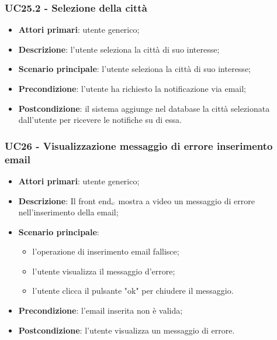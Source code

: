 \subsubsection{UC25.2 - Selezione della città}\label{CasiDUsoCasiDUsoFacoltativiTraUnUtenteEIlFrontEndElencoCasiDUsoUC15.2SelezioneCitta}

\begin{itemize}
	\item \textbf{Attori primari}: utente generico;
	\item \textbf{Descrizione}: l'utente seleziona la città di suo interesse;
	\item \textbf{Scenario principale}: l'utente seleziona la città di suo interesse;
	\item \textbf{Precondizione}: l'utente ha richiesto la notificazione via email;
	\item \textbf{Postcondizione}: il sistema aggiunge nel database la città selezionata dall'utente per ricevere le notifiche su di essa.
\end{itemize}


\subsubsection{UC26 - Visualizzazione messaggio di errore inserimento email}\label{CasiDUsoCasiDUsoFacoltativiTraUnUtenteEIlFrontEndElencoCasiDUsoUC16VisualizzazioneMessaggioDiErroreEmailErrata}

\begin{itemize}
	\item \textbf{Attori primari}: utente generico;
	\item \textbf{Descrizione}: Il front end$_{\scaleto{G}{3pt}}$ mostra a video un messaggio di errore nell'inserimento della email;
	\item \textbf{Scenario principale}: \begin{itemize}
		\item l'operazione di inserimento email fallisce;
		\item l'utente visualizza il messaggio d'errore;
		\item l'utente clicca il pulsante "ok" per chiudere il messaggio.
	\end{itemize}
	\item \textbf{Precondizione}: l'email inserita non è valida;
	\item \textbf{Postcondizione}: l'utente visualizza un messaggio di errore.
\end{itemize}



